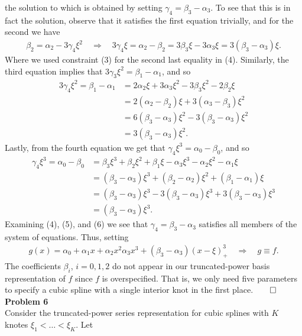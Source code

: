 \documentclass[10pt]{article}
\newcommand{\1}[1]{\mathbbm{1}_{#1}}
\begin{document}
    the solution to which is obtained by setting $\gamma_4=\beta_3-\alpha_3$. To see that this is in fact the solution, observe that it satisfies the first equation trivially, and for the second we have
    \begin{align*}
        \beta_2=\alpha_2-3\gamma_4\xi^2\quad\Rightarrow\quad 3\gamma_4\xi=\alpha_2-\beta_2=3\beta_3\xi-3\alpha_3\xi=3(\beta_3-\alpha_3)\xi.\tag{4}
    \end{align*}
    Where we used constraint (3) for the second last equality in (4). Similarly, the third equation implies that $3\gamma_3\xi^2=\beta_1-\alpha_1$, and so
    \begin{align*}
        3\gamma_4\xi^2=\beta_1-\alpha_1&=2\alpha_2\xi+3\alpha_3\xi^2-3\beta_3\xi^2-2\beta_2\xi\tag{by (2)}\\
        &=2(\alpha_2-\beta_2)\xi+3(\alpha_3-\beta_3)\xi^2\\
        &=6(\beta_3-\alpha_3)\xi^2-3(\beta_3-\alpha_3)\xi^2\tag{by (4)}\\
        &=3(\beta_3-\alpha_3)\xi^2.\tag{5}
    \end{align*}
    Lastly, from the fourth equation we get that $\gamma_4\xi^3=\alpha_0-\beta_0$, and so
    \begin{align*}
        \gamma_4\xi^3=\alpha_0-\beta_0&=\beta_3\xi^3+\beta_2\xi^2+\beta_1\xi-\alpha_3\xi^3-\alpha_2\xi^2-\alpha_1\xi\\
        &=(\beta_3-\alpha_3)\xi^3+(\beta_2-\alpha_2)\xi^2+(\beta_1-\alpha_1)\xi\\
        &=(\beta_3-\alpha_3)\xi^3-3(\beta_3-\alpha_3)\xi^3+3(\beta_3-\alpha_3)\xi^3\tag{by (4) and (5)}\\
        &=(\beta_3-\alpha_3)\xi^3.\tag{6}
    \end{align*}
    Examining (4), (5), and (6) we see that $\gamma_4=\beta_3-\alpha_3$ satisfies all members of the system of equations. Thus, setting
    \begin{align*}
        g(x)=\alpha_0+\alpha_1x+\alpha_2x^2\alpha_3x^3+(\beta_3-\alpha_3)(x-\xi)^3_+\quad\Rightarrow\quad g\equiv f.
    \end{align*}
    The coefficients $\beta_i$, $i=0,1,2$ do not appear in our truncated-power basis representation of $f$ since $f$ is overspecified. That is, we only need five parameters to
    specify a cubic spline with a single interior knot in the first place.\hfill{$\qed$}\\[5pt]
    {\bf Problem 6}\\[5pt]
    Consider the truncated-power series representation for cubic splines with $K$ knotes $\xi_1<\dots<\xi_K$. Let
\end{document}
